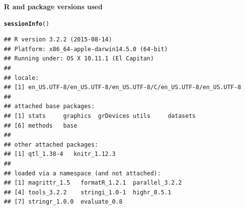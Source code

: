 \documentclass[12pt]{article}\usepackage[]{graphicx}\usepackage[]{color}
\makeatletter
\newcommand{\hlstd}[1]{\textcolor[rgb]{0.345,0.345,0.345}{#1}}%
\newcommand{\hlkwd}[1]{\textcolor[rgb]{0.737,0.353,0.396}{\textbf{#1}}}%
\newenvironment{kframe}{%
 \def\at@end@of@kframe{}%
 \ifinner\ifhmode%
  \def\at@end@of@kframe{\end{minipage}}%
  \begin{minipage}{\columnwidth}%
 \fi\fi%
 \def\FrameCommand##1{\hskip\@totalleftmargin \hskip-\fboxsep
 \colorbox{shadecolor}{##1}\hskip-\fboxsep
     \hskip-\linewidth \hskip-\@totalleftmargin \hskip\columnwidth}%
 \MakeFramed {\advance\hsize-\width
   \@totalleftmargin\z@ \linewidth\hsize
   \@setminipage}}%
 {\par\unskip\endMakeFramed%
 \at@end@of@kframe}
\newenvironment{knitrout}{}{} %
\makeatother
\begin{document}
\bigskip
{\sffamily \textbf{R and package versions used}}
\nopagebreak

\begin{knitrout}
\color{fgcolor}\begin{kframe}
\begin{alltt}
\hlkwd{sessionInfo}\hlstd{()}
\end{alltt}
\begin{verbatim}
## R version 3.2.2 (2015-08-14)
## Platform: x86_64-apple-darwin14.5.0 (64-bit)
## Running under: OS X 10.11.1 (El Capitan)
## 
## locale:
## [1] en_US.UTF-8/en_US.UTF-8/en_US.UTF-8/C/en_US.UTF-8/en_US.UTF-8
## 
## attached base packages:
## [1] stats     graphics  grDevices utils     datasets 
## [6] methods   base     
## 
## other attached packages:
## [1] qtl_1.38-4   knitr_1.12.3
## 
## loaded via a namespace (and not attached):
## [1] magrittr_1.5   formatR_1.2.1  parallel_3.2.2
## [4] tools_3.2.2    stringi_1.0-1  highr_0.5.1   
## [7] stringr_1.0.0  evaluate_0.8
\end{verbatim}
\end{kframe}
\end{knitrout}
\end{document}
